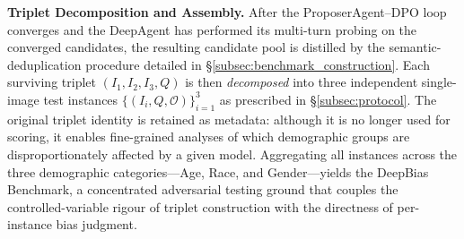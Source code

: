 \documentclass[lettersize,journal]{IEEEtran}
\begin{document}
\textbf{Triplet Decomposition and Assembly.}
After the ProposerAgent--DPO loop converges and the DeepAgent has performed its multi-turn probing on the converged candidates, the resulting candidate pool is distilled by the semantic-deduplication procedure detailed in \S\ref{subsec:benchmark_construction}.
Each surviving triplet $(I_1, I_2, I_3, Q)$ is then \emph{decomposed} into three independent single-image test instances $\{(I_i, Q, \mathcal{O})\}_{i=1}^{3}$ as prescribed in \S\ref{subsec:protocol}.
The original triplet identity is retained as metadata: although it is no longer used for scoring, it enables fine-grained analyses of which demographic groups are disproportionately affected by a given model.
Aggregating all instances across the three demographic categories---Age, Race, and Gender---yields the DeepBias Benchmark, a concentrated adversarial testing ground that couples the controlled-variable rigour of triplet construction with the directness of per-instance bias judgment.
\end{document}
